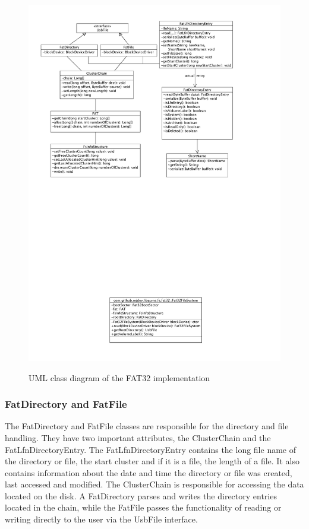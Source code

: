 \begin{figure}[h!]
\caption{UML class diagram of the FAT32 implementation}
\centering
\includegraphics[scale=0.9352]{figures/fat_package}
\label{figure:fat_package}
\end{figure}

\subsubsection{FatDirectory and FatFile}

The FatDirectory and FatFile classes are responsible for the directory and file handling. They have two important attributes, the ClusterChain and the FatLfnDirectoryEntry. The FatLfnDirectoryEntry contains the long file name of the directory or file, the start cluster and if it is a file, the length of a file. It also contains information about the date and time the directory or file was created, last accessed and modified. 
The ClusterChain is responsible for accessing the data located on the disk. A FatDirectory parses and writes the directory entries located in the chain, while the FatFile passes the functionality of reading or writing directly to the user via the UsbFile interface.

